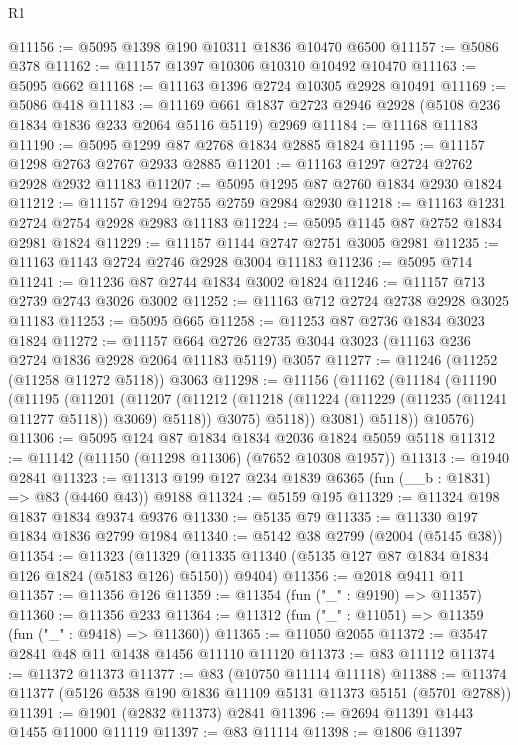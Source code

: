 \begin{lexlean}{R1}
\begin{coremodule}
@11156 := @5095 @1398 @190 @10311 @1836 @10470 @6500
@11157 := @5086 @378
@11162 := @11157 @1397 @10306 @10310 @10492 @10470
@11163 := @5095 @662
@11168 := @11163 @1396 @2724 @10305 @2928 @10491
@11169 := @5086 @418
@11183 := @11169 @661 @1837 @2723 @2946 @2928 (@5108 @236 @1834 @1836 @233 @2064 @5116 @5119) @2969
@11184 := @11168 @11183
@11190 := @5095 @1299 @87 @2768 @1834 @2885 @1824
@11195 := @11157 @1298 @2763 @2767 @2933 @2885
@11201 := @11163 @1297 @2724 @2762 @2928 @2932 @11183
@11207 := @5095 @1295 @87 @2760 @1834 @2930 @1824
@11212 := @11157 @1294 @2755 @2759 @2984 @2930
@11218 := @11163 @1231 @2724 @2754 @2928 @2983 @11183
@11224 := @5095 @1145 @87 @2752 @1834 @2981 @1824
@11229 := @11157 @1144 @2747 @2751 @3005 @2981
@11235 := @11163 @1143 @2724 @2746 @2928 @3004 @11183
@11236 := @5095 @714
@11241 := @11236 @87 @2744 @1834 @3002 @1824
@11246 := @11157 @713 @2739 @2743 @3026 @3002
@11252 := @11163 @712 @2724 @2738 @2928 @3025 @11183
@11253 := @5095 @665
@11258 := @11253 @87 @2736 @1834 @3023 @1824
@11272 := @11157
    @664
    @2726
    @2735
    @3044
    @3023
    (@11163 @236 @2724 @1836 @2928 @2064 @11183 @5119)
    @3057
@11277 := @11246 (@11252 (@11258 @11272 @5118)) @3063
@11298 := @11156
    (@11162
      (@11184
        (@11190
          (@11195
            (@11201
              (@11207
                (@11212 (@11218 (@11224 (@11229 (@11235 (@11241 @11277 @5118)) @3069) @5118)) @3075)
                @5118))
            @3081)
          @5118))
      @10576)
@11306 := @5095 @124 @87 @1834 @1834 @2036 @1824 @5059 @5118
@11312 := @11142 (@11150 (@11298 @11306) (@7652 @10308 @1957))
@11313 := @1940 @2841
@11323 := @11313 @199 @127 @234 @1839 @6365 (fun (__b : @1831) => @83 (@4460 @43)) @9188
@11324 := @5159 @195
@11329 := @11324 @198 @1837 @1834 @9374 @9376
@11330 := @5135 @79
@11335 := @11330 @197 @1834 @1836 @2799 @1984
@11340 := @5142 @38 @2799 (@2004 (@5145 @38))
@11354 := @11323
    (@11329 (@11335 @11340 (@5135 @127 @87 @1834 @1834 @126 @1824 (@5183 @126) @5150)) @9404)
@11356 := @2018 @9411 @11
@11357 := @11356 @126
@11359 := @11354 (fun ("_" : @9190) => @11357)
@11360 := @11356 @233
@11364 := @11312 (fun ("_" : @11051) => @11359 (fun ("_" : @9418) => @11360))
@11365 := @11050 @2055
@11372 := @3547 @2841 @48 @11 @1438 @1456 @11110 @11120
@11373 := @83 @11112
@11374 := @11372 @11373
@11377 := @83 (@10750 @11114 @11118)
@11388 := @11374 @11377 (@5126 @538 @190 @1836 @11109 @5131 @11373 @5151 (@5701 @2788))
@11391 := @1901 (@2832 @11373) @2841
@11396 := @2694 @11391 @1443 @1455 @11000 @11119
@11397 := @83 @11114
@11398 := @1806 @11397

\end{coremodule}
\end{lexlean}

